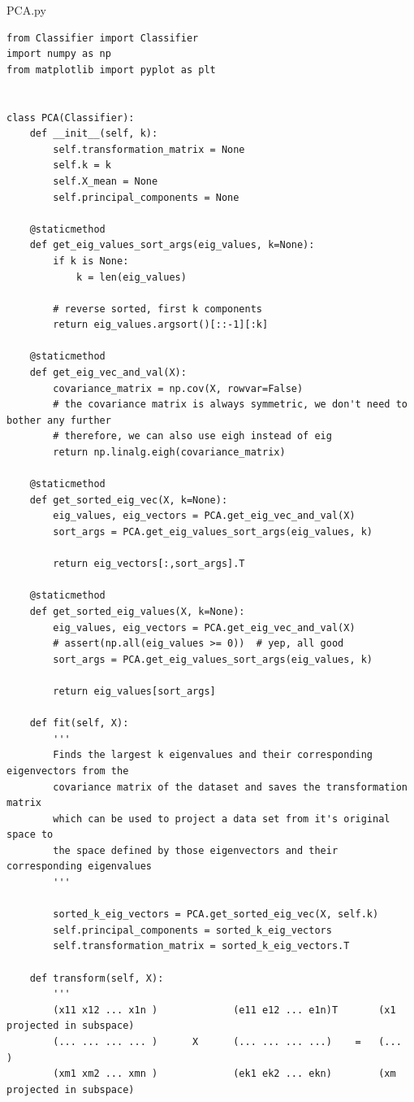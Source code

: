 PCA.py
\begin{lstlisting}[style=py]
from Classifier import Classifier
import numpy as np
from matplotlib import pyplot as plt


class PCA(Classifier):
    def __init__(self, k):
        self.transformation_matrix = None
        self.k = k
        self.X_mean = None
        self.principal_components = None

    @staticmethod
    def get_eig_values_sort_args(eig_values, k=None):
        if k is None:
            k = len(eig_values)

        # reverse sorted, first k components
        return eig_values.argsort()[::-1][:k]

    @staticmethod
    def get_eig_vec_and_val(X):
        covariance_matrix = np.cov(X, rowvar=False)
        # the covariance matrix is always symmetric, we don't need to bother any further
        # therefore, we can also use eigh instead of eig
        return np.linalg.eigh(covariance_matrix)

    @staticmethod
    def get_sorted_eig_vec(X, k=None):
        eig_values, eig_vectors = PCA.get_eig_vec_and_val(X)
        sort_args = PCA.get_eig_values_sort_args(eig_values, k)

        return eig_vectors[:,sort_args].T

    @staticmethod
    def get_sorted_eig_values(X, k=None):
        eig_values, eig_vectors = PCA.get_eig_vec_and_val(X)
        # assert(np.all(eig_values >= 0))  # yep, all good
        sort_args = PCA.get_eig_values_sort_args(eig_values, k)

        return eig_values[sort_args]

    def fit(self, X):
        '''
        Finds the largest k eigenvalues and their corresponding eigenvectors from the
        covariance matrix of the dataset and saves the transformation matrix
        which can be used to project a data set from it's original space to
        the space defined by those eigenvectors and their corresponding eigenvalues
        '''

        sorted_k_eig_vectors = PCA.get_sorted_eig_vec(X, self.k)
        self.principal_components = sorted_k_eig_vectors
        self.transformation_matrix = sorted_k_eig_vectors.T

    def transform(self, X):
        '''
        (x11 x12 ... x1n )             (e11 e12 ... e1n)T       (x1 projected in subspace)
        (... ... ... ... )      X      (... ... ... ...)    =   (...                     )
        (xm1 xm2 ... xmn )             (ek1 ek2 ... ekn)        (xm projected in subspace)


\end{lstlisting}
